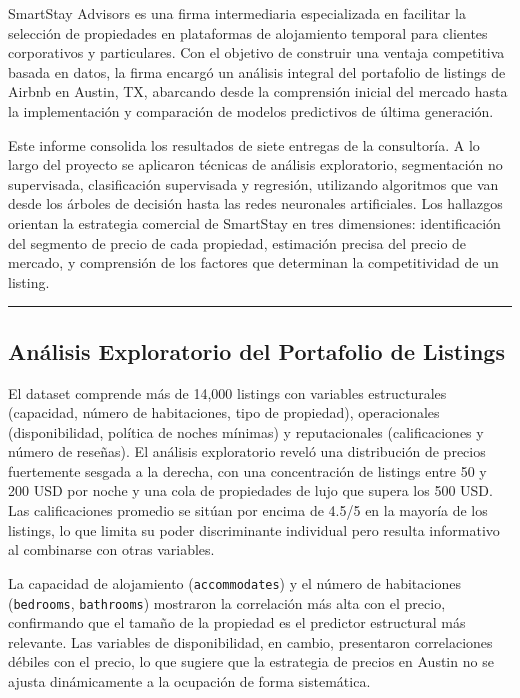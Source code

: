 \documentclass[
]{article}
\begin{document}
SmartStay Advisors es una firma intermediaria especializada en facilitar
la selección de propiedades en plataformas de alojamiento temporal para
clientes corporativos y particulares. Con el objetivo de construir una
ventaja competitiva basada en datos, la firma encargó un análisis
integral del portafolio de listings de Airbnb en Austin, TX, abarcando
desde la comprensión inicial del mercado hasta la implementación y
comparación de modelos predictivos de última generación.

Este informe consolida los resultados de siete entregas de la
consultoría. A lo largo del proyecto se aplicaron técnicas de análisis
exploratorio, segmentación no supervisada, clasificación supervisada y
regresión, utilizando algoritmos que van desde los árboles de decisión
hasta las redes neuronales artificiales. Los hallazgos orientan la
estrategia comercial de SmartStay en tres dimensiones: identificación
del segmento de precio de cada propiedad, estimación precisa del precio
de mercado, y comprensión de los factores que determinan la
competitividad de un listing.

\begin{center}\rule{0.5\linewidth}{0.5pt}\end{center}

\subsection{Análisis Exploratorio del Portafolio de
Listings}\label{anuxe1lisis-exploratorio-del-portafolio-de-listings}

El dataset comprende más de 14,000 listings con variables estructurales
(capacidad, número de habitaciones, tipo de propiedad), operacionales
(disponibilidad, política de noches mínimas) y reputacionales
(calificaciones y número de reseñas). El análisis exploratorio reveló
una distribución de precios fuertemente sesgada a la derecha, con una
concentración de listings entre 50 y 200 USD por noche y una cola de
propiedades de lujo que supera los 500 USD. Las calificaciones promedio
se sitúan por encima de 4.5/5 en la mayoría de los listings, lo que
limita su poder discriminante individual pero resulta informativo al
combinarse con otras variables.

La capacidad de alojamiento (\texttt{accommodates}) y el número de
habitaciones (\texttt{bedrooms}, \texttt{bathrooms}) mostraron la
correlación más alta con el precio, confirmando que el tamaño de la
propiedad es el predictor estructural más relevante. Las variables de
disponibilidad, en cambio, presentaron correlaciones débiles con el
precio, lo que sugiere que la estrategia de precios en Austin no se
ajusta dinámicamente a la ocupación de forma sistemática.
\end{document}
